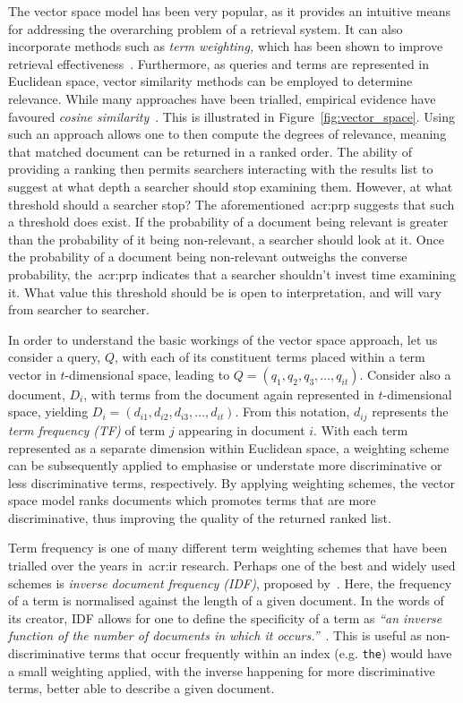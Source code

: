 The vector space model has been very popular, as it provides an intuitive means for addressing the overarching problem of a retrieval system. It can also incorporate methods such as \emph{term weighting,} which has been shown to improve retrieval effectiveness~\citep{croft2010search}. Furthermore, as queries and terms are represented in Euclidean space, vector similarity methods can be employed to determine relevance. While many approaches have been trialled, empirical evidence have favoured \emph{cosine similarity}~\citep{croft2010search}. This is illustrated in Figure~\ref{fig:vector_space}. Using such an approach allows one to then compute the degrees of relevance, meaning that matched document can be returned in a ranked order. The ability of providing a ranking then permits searchers interacting with the results list to suggest at what depth a searcher should stop examining them. However, at what threshold should a searcher stop? The aforementioned~\gls{acr:prp} suggests that such a threshold does exist. If the probability of a document being relevant is greater than the probability of it being non-relevant, a searcher should look at it. Once the probability of a document being non-relevant outweighs the converse probability, the~\gls{acr:prp} indicates that a searcher shouldn't invest time examining it. What value this threshold should be is open to interpretation, and will vary from searcher to searcher.

In order to understand the basic workings of the vector space approach, let us consider a query, $Q$, with each of its constituent terms placed within a term vector in $t$-dimensional space, leading to $Q = (q_1, q_2, q_3,\dotsc, q_{it})$. Consider also a document, $D_i$, with terms from the document again represented in $t$-dimensional space, yielding $D_i = (d_{i1}, d_{i2}, d_{i3},\dotsc, d_{it})$. From this notation, $d_{ij}$ represents the \emph{term frequency (TF)} of term $j$ appearing in document $i$. With each term represented as a separate dimension within Euclidean space, a weighting scheme can be subsequently applied to emphasise or understate more discriminative or less discriminative terms, respectively. By applying weighting schemes, the vector space model ranks documents which promotes terms that are more discriminative, thus improving the quality of the returned ranked list.

Term frequency is one of many different term weighting schemes that have been trialled over the years in~\gls{acr:ir} research. Perhaps one of the best and widely used schemes is \emph{inverse document frequency (IDF)}, proposed by~\cite{sparck1972statistical}. Here, the frequency of a term is normalised against the length of a given document. In the words of its creator, IDF allows for one to define the specificity of a term as \emph{``an inverse function of the number of documents in which it occurs.''}~\citep{sparck1972statistical}. This is useful as non-discriminative terms that occur frequently within an index (e.g. \texttt{the}) would have a small weighting applied, with the inverse happening for more discriminative terms, better able to describe a given document.

